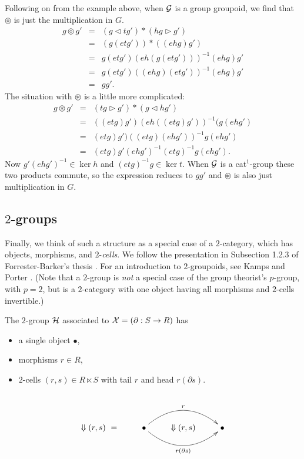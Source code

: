 Following on from the example above, when $\mathcal{G}$ is a group groupoid, 
we find that $\circledcirc$ is just the multiplication in $G$. 
\begin{eqnarray*}
g \circledcirc g' &=& (g \lhd tg') * (hg \rhd g') \\
              &=& (g(etg'))*((ehg)g') \\ 
              &=& g(etg')(eh(g(etg')))^{-1}(ehg)g' \\ 
              &=& g(etg')((ehg)(etg'))^{-1}(ehg)g' \\ 
              &=& gg'. 
\end{eqnarray*} 
\noindent
The situation with $\circledast$ is a little more complicated: 
\begin{eqnarray*}
g \circledast g' &=& (tg \rhd g') * (g \lhd hg') \\ 
                 &=& ((etg)g')(eh((etg)g'))^{-1}(g(ehg') \\ 
                 &=& (etg)g')((etg)(ehg'))^{-1}g(ehg') \\ 
                 &=& (etg)g'(ehg')^{-1}(etg)^{-1}g(ehg'). 
\end{eqnarray*} 
Now $g'(ehg')^{-1} \in \ker h$ and $(etg)^{-1}g \in \ker t$. 
When $\mathcal{G}$ is a cat$^1$-group these two products commute, 
so the expression reduces to $gg'$ and $\circledast$ is also 
just multiplication in $G$.


\newpage
\subsection{$2$-groups} \label{subs:twogps}

Finally, we think of such a structure as a special case of a 
   
$2$-category, which has objects, morphisms, and $2$-\emph{cells}.
We follow the presentation in Subsection 1.2.3 of 
Forrester-Barker's thesis \cite{f-b-thesis}. 
For an introduction to $2$-groupoids, 
see Kamps and Porter \cite{kamps:port}.
(Note that a $2$-group is \emph{not} a special case of the group theorist's 
$p$-group, with $p=2$, but is a $2$-category with one object having all 
morphisms and $2$-cells invertible.)

The $2$-group $\mathcal{H}$ associated to $\mathcal{X} = (\partial : S \to R)$ has
\begin{itemize}
\item  a single object $\bullet$,
\item  morphisms $r \in R$,
\item  $2$-cells $(r,s) \in R \ltimes S$
       with tail $r$ and head $r(\partial s)$.
\end{itemize}
$$
\xy
\xymatrix{
   & & & \\
 \Downarrow (r,s)~= 
   & \bullet  \ar@/^5ex/[rr]^{r} 
              \ar@/_5ex/[rr]_{r(\partial s)} 
     & \Downarrow (r,s)
        & \bullet \\
   & & & \\
}
\endxy
$$

